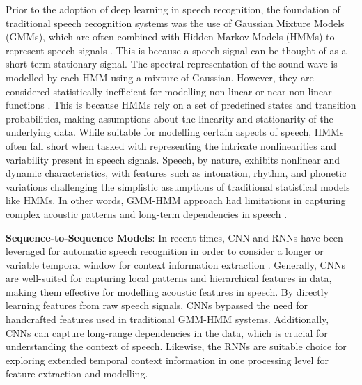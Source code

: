 \documentclass[preprint,12pt]{elsarticle}
\begin{document}
Prior to the adoption of deep learning in speech recognition, the foundation of traditional speech recognition systems was the use of Gaussian Mixture Models (GMMs), which are often combined with Hidden Markov Models (HMMs) to represent speech signals \citep{srivastava2022speech}. This is because a speech signal can be thought of as a short-term stationary signal. The spectral representation of the sound wave is modelled by each HMM using a mixture of Gaussian. However, they are considered statistically inefficient for modelling non-linear or near non-linear functions \citep{padmanabhan2015review,Nassif2019}. This is because HMMs rely on a set of predefined states and transition probabilities, making assumptions about the linearity and stationarity of the underlying data. While suitable for modelling certain aspects of speech, HMMs often fall short when tasked with representing the intricate nonlinearities and variability present in speech signals. Speech, by nature, exhibits nonlinear and dynamic characteristics, with features such as intonation, rhythm, and phonetic variations challenging the simplistic assumptions of traditional statistical models like HMMs. In other words, GMM-HMM approach had limitations in capturing complex acoustic patterns and long-term dependencies in speech \citep{mukhamadiyev2022automatic}.

\textbf{Sequence-to-Sequence Models}: In recent times, CNN and RNNs have been leveraged for automatic speech recognition in order to consider a longer or variable temporal window for context information extraction \citep{lu2020automatic}. Generally, CNNs are well-suited for capturing local patterns and hierarchical features in data, making them effective for modelling acoustic features in speech. By directly learning features from raw speech signals, CNNs bypassed the need for handcrafted features used in traditional GMM-HMM systems. Additionally, CNNs can capture long-range dependencies in the data, which is crucial for understanding the context of speech. Likewise, the RNNs are suitable choice for exploring extended temporal context information in one processing level for feature extraction and modelling. 
\end{document}
